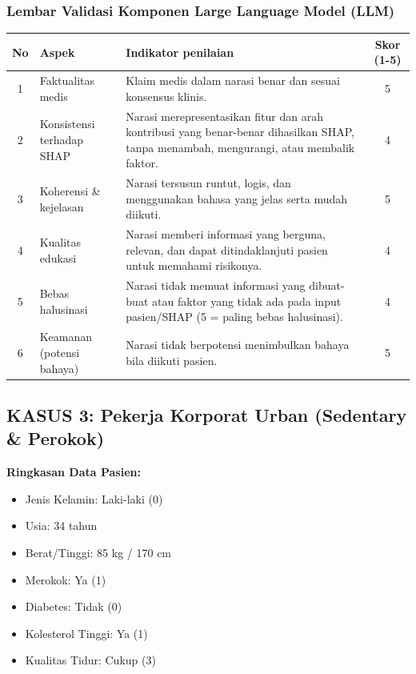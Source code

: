 \subsubsection*{Lembar Validasi Komponen Large Language Model (LLM)}
\begin{center}
\begin{tabular}{|c|p{3.5cm}|p{7.5cm}|c|}
\hline
\textbf{No} & \textbf{Aspek} & \textbf{Indikator penilaian} & \textbf{Skor (1-5)} \\ \hline
1 & Faktualitas medis & Klaim medis dalam narasi benar dan sesuai konsensus klinis. & 5 \\ \hline
2 & Konsistensi terhadap SHAP & Narasi merepresentasikan fitur dan arah kontribusi yang benar-benar dihasilkan SHAP, tanpa menambah, mengurangi, atau membalik faktor. & 4 \\ \hline
3 & Koherensi \& kejelasan & Narasi tersusun runtut, logis, dan menggunakan bahasa yang jelas serta mudah diikuti. & 5 \\ \hline
4 & Kualitas edukasi & Narasi memberi informasi yang berguna, relevan, dan dapat ditindaklanjuti pasien untuk memahami risikonya. & 4 \\ \hline
5 & Bebas halusinasi & Narasi tidak memuat informasi yang dibuat-buat atau faktor yang tidak ada pada input pasien/SHAP (5 = paling bebas halusinasi). & 4 \\ \hline
6 & Keamanan (potensi bahaya) & Narasi tidak berpotensi menimbulkan bahaya bila diikuti pasien. & 5 \\ \hline
\end{tabular}
\end{center}

\vspace{1.5cm}

\subsection*{KASUS 3: Pekerja Korporat Urban (Sedentary \& Perokok)}
\textbf{Ringkasan Data Pasien:}
\begin{itemize}
    \item Jenis Kelamin: Laki-laki (0)
    \item Usia: 34 tahun
    \item Berat/Tinggi: 85 kg / 170 cm
    \item Merokok: Ya (1)
    \item Diabetes: Tidak (0)
    \item Kolesterol Tinggi: Ya (1)
    \item Kualitas Tidur: Cukup (3)
\end{itemize}

